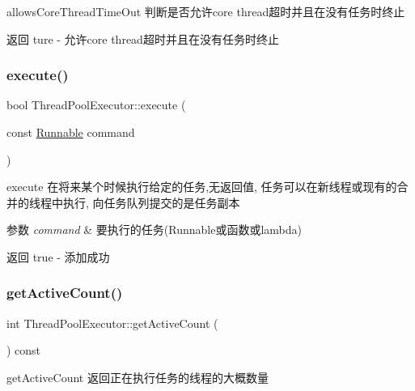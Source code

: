 allows\+Core\+Thread\+Time\+Out 判断是否允许core thread超时并且在没有任务时终止 

\begin{DoxyReturn}{返回}
ture -\/ 允许core thread超时并且在没有任务时终止 
\end{DoxyReturn}
\mbox{\label{classThreadPoolExecutor_a04e334b5d7f3b383aa01fbac80120feb}} 
\subsubsection{\texorpdfstring{execute()}{execute()}}
{\footnotesize\ttfamily bool Thread\+Pool\+Executor\+::execute (\begin{DoxyParamCaption}\item[{const \hyperlink{classRunnable}{Runnable}}]{command }\end{DoxyParamCaption})}



execute 在将来某个时候执行给定的任务,无返回值, 任务可以在新线程或现有的合并的线程中执行, 向任务队列提交的是任务副本 


\begin{DoxyParams}{参数}
{\em command} & 要执行的任务(Runnable或函数或lambda)\\
\hline
\end{DoxyParams}
\begin{DoxyReturn}{返回}
true -\/ 添加成功 
\end{DoxyReturn}
\mbox{\label{classThreadPoolExecutor_a1a4a5262dc8db7933c27dbbc267d4825}} 
\subsubsection{\texorpdfstring{get\+Active\+Count()}{getActiveCount()}}
{\footnotesize\ttfamily int Thread\+Pool\+Executor\+::get\+Active\+Count (\begin{DoxyParamCaption}{ }\end{DoxyParamCaption}) const}



get\+Active\+Count 返回正在执行任务的线程的大概数量 

